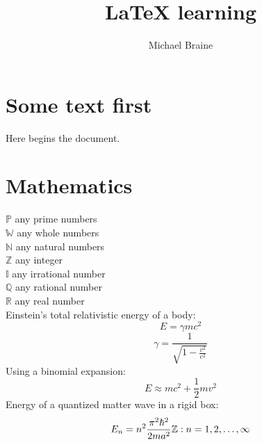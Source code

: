 \documentclass[a4paper, twoside, fleqn, onecolumn, 11pt]{article}
\author{Michael Braine}
\title{LaTeX learning}
\begin{document}
  \maketitle
  \tableofcontents

  \section{Some text first}
  Here begins the document.

  \section{Mathematics}
  $\mathbb{P}$ any prime numbers \\
  $\mathbb{W}$ any whole numbers \\
  $\mathbb{N}$ any natural numbers \\
  $\mathbb{Z}$ any integer \\
  $\mathbb{I}$ any irrational number \\
  $\mathbb{Q}$ any rational number \\
  $\mathbb{R}$ any real number \\
  Einstein's total relativistic energy of a body:
  \begin{equation}
    E = \gamma m c^2
  \end{equation}
  \begin{equation*}
    \gamma = \frac{1}{\sqrt{1 - \frac{v^2}{c^2}}}
  \end{equation*}
  Using a binomial expansion:
  \begin{equation}
    E \approx mc^2 + \frac{1}{2}mv^2
  \end{equation}
  Energy of a quantized matter wave in a rigid box:
  \begin{equation}
    E_n = n^2 \frac{\pi^2\hbar^2}{2ma^2}
    \newline
    \mathbb{Z}: n = 1, 2, \ldots, \infty
  \end{equation}
\end{document}
